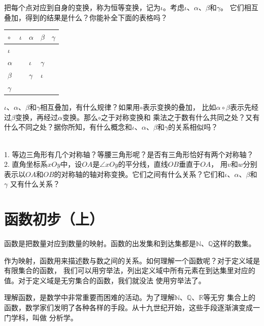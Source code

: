 \documentclass[12pt,UTF8]{ctexbook}
\begin{document}
把每个点对应到自身的变换，称为恒等变换，记为$\iota$。考虑$\iota$、$\alpha$、$\beta$和$\gamma$。
它们相互叠加，得到的结果是什么？你能补全下面的表格吗？
\begin{center}
    \begin{tabular}{  | p{2em}<{\centering} | p{2em}<{\centering} | p{2em}<{\centering} | p{2em}<{\centering} | p{2em}<{\centering} | }
        \hline
        $\circ$ & $\iota$ & $\alpha$ & $\beta$ & $\gamma$ \\ [0.5ex] 
        \hline
        $\iota$ &  &  &  &  \\  
        \hline
        $\alpha$ &  & $\iota$ & $\gamma$ &  \\  
        \hline
        $\beta$ &  & $\gamma$ & $\iota$ &  \\  
        \hline
        $\gamma$ &  &  &  &  \\ 
        \hline 
    \end{tabular}
\end{center}
$\iota$、$\alpha$、$\beta$和$\gamma$相互叠加，有什么规律？如果用$\circ$表示变换的叠加，
比如$\alpha \circ \beta$表示先经过$\beta$变换，再经过$\alpha$变换。那么$\circ$之于对称变换和
乘法之于数有什么共同之处？又有什么不同之处？据你所知，有什么概念和$\iota$、$\alpha$、$\beta$和$\gamma$的关系相似吗？

\begin{sk}\label{xt:4-2-0}
    \mbox{}\\
    1. 等边三角形有几个对称轴？等腰三角形呢？是否有三角形恰好有两个对称轴？\\
    2. 直角坐标系$xOy$中，设$OA$是$\angle xOy$的平分线，直线$OB$垂直于$OA$，
    用$v$和$w$分别表示以$OA$和$OB$的对称轴的轴对称变换。它们之间有什么关系？它们和$\iota$、$\alpha$、$\beta$和$\gamma$
    又有什么关系？
\end{sk}

\chapter{函数初步（上）}
函数是把数量对应到数量的映射。函数的出发集和到达集都是$\mathbb{N}$、$\mathbb{Q}$这样的数集。

作为映射，函数用来描述数与数之间的关系。如何理解一个函数呢？对于定义域是有限集合的函数，
我们可以用穷举法，列出定义域中所有元素在到达集里对应的值。对于定义域是无穷集合的函数，我们就没法
使用穷举法了。

理解函数，是数学中非常重要而困难的活动。为了理解$\mathbb{N}$、$\mathbb{Q}$、$\mathbb{R}$等无穷
集合上的函数，数学家们发明了各种各样的手段。从十九世纪开始，这些手段逐渐演变成一门学科，叫做
分析学。
\end{document}
